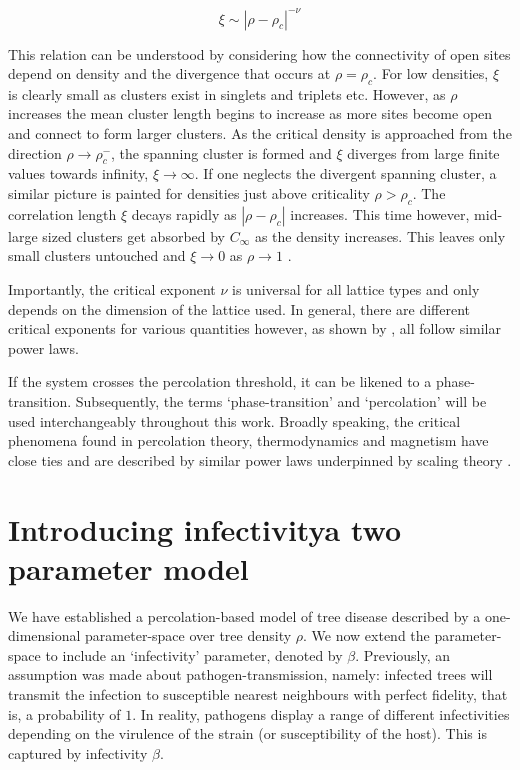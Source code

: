 \begin{equation*}
    \xi \sim |\rho - \rho_c|^{-\nu}
\end{equation*}

This relation can be understood by considering how the connectivity of open sites depend on density and the divergence that occurs at $\rho=\rho_c$. %
For low densities, $\xi$ is clearly small as clusters exist in singlets and triplets etc. %
However, as $\rho$ increases the mean cluster length begins to increase as more sites become open and connect to form larger clusters. %
As the critical density is approached from the direction $\rho \rightarrow \rho_c^{-}$, the spanning cluster is formed and $\xi$ diverges from large finite values towards infinity, $\xi \rightarrow \infty$. %
If one neglects the divergent spanning cluster, a similar picture is painted for densities just above criticality $\rho > \rho_c$. %
The correlation length $\xi$ decays rapidly as $|\rho - \rho_c|$ increases. %
This time however,  mid-large sized clusters get absorbed by $C_\infty$ as the density increases. %
This leaves only small clusters untouched and $\xi \rightarrow 0 $ as $\rho \rightarrow 1$ \cite[see][for a detailed break-down of power laws and correlation length.]{STAUFFER19791}. %

Importantly, the critical exponent $\nu$ is universal for all lattice types and only depends on the dimension of the lattice used. In general, there are different critical exponents for various quantities however, as shown by \cite{stauffer2018introduction, STAUFFER19791}, all follow similar power laws. 

If the system crosses the percolation threshold, it can be likened to a phase-transition. %
Subsequently, the terms `phase-transition' and `percolation' will be used interchangeably throughout this work. %
Broadly speaking, the critical phenomena found in percolation theory, thermodynamics and magnetism have close ties and are described by similar power laws underpinned by scaling theory \cite{Essam_1980}. %

\section{Introducing infectivity\textemdash a two parameter model}
\label{ch3:two-param-model}

We have established a percolation-based model of tree disease described by a one-dimensional parameter-space over tree density $\rho$. %
We now extend the parameter-space to include an `infectivity' parameter, denoted by $\beta$. %
Previously, an assumption was made about pathogen-transmission, namely: %
infected trees will transmit the infection to susceptible nearest neighbours with perfect fidelity, %
that is, a probability of $1$. In reality, pathogens display a range of different infectivities depending on the virulence of the strain (or susceptibility of the host). %
This is captured by infectivity $\beta$. 

